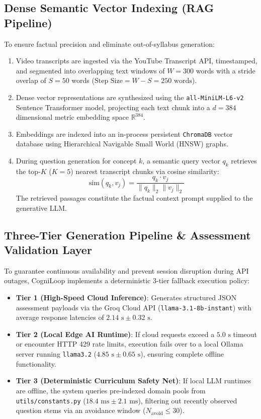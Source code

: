 \documentclass[journal]{IEEEtran}
\begin{document}
\subsection{Dense Semantic Vector Indexing (RAG Pipeline)}
To ensure factual precision and eliminate out-of-syllabus generation:
\begin{enumerate}
    \item Video transcripts are ingested via the YouTube Transcript API, timestamped, and segmented into overlapping text windows of $W=300$ words with a stride overlap of $S=50$ words ($\text{Step Size} = W - S = 250\text{ words}$).
    \item Dense vector representations are synthesized using the \texttt{all-MiniLM-L6-v2} Sentence Transformer model, projecting each text chunk into a $d=384$ dimensional metric embedding space $\mathbb{R}^{384}$.
    \item Embeddings are indexed into an in-process persistent \texttt{ChromaDB} vector database using Hierarchical Navigable Small World (HNSW) graphs.
    \item During question generation for concept $k$, a semantic query vector $q_k$ retrieves the top-$K$ ($K=5$) nearest transcript chunks via cosine similarity:
    \begin{equation}
    \text{sim}(q_k, v_j) = \frac{q_k \cdot v_j}{\|q_k\|_2 \|v_j\|_2}
    \end{equation}
    The retrieved passages constitute the factual context prompt supplied to the generative LLM.
\end{enumerate}

\subsection{Three-Tier Generation Pipeline \& Assessment Validation Layer}
To guarantee continuous availability and prevent session disruption during API outages, CogniLoop implements a deterministic 3-tier fallback execution policy:
\begin{itemize}
    \item \textbf{Tier 1 (High-Speed Cloud Inference)}: Generates structured JSON assessment payloads via the Groq Cloud API (\texttt{llama-3.1-8b-instant}) with average response latencies of $2.14\text{ s} \pm 0.32\text{ s}$.
    \item \textbf{Tier 2 (Local Edge AI Runtime)}: If cloud requests exceed a $5.0\text{ s}$ timeout or encounter HTTP 429 rate limits, execution fails over to a local Ollama server running \texttt{llama3.2} ($4.85\text{ s} \pm 0.65\text{ s}$), ensuring complete offline functionality.
    \item \textbf{Tier 3 (Deterministic Curriculum Safety Net)}: If local LLM runtimes are offline, the system queries pre-indexed domain pools from \texttt{utils/constants.py} ($18.4\text{ ms} \pm 2.1\text{ ms}$), filtering out recently observed question stems via an avoidance window ($N_{\text{avoid}} \le 30$).
\end{itemize}
\end{document}
